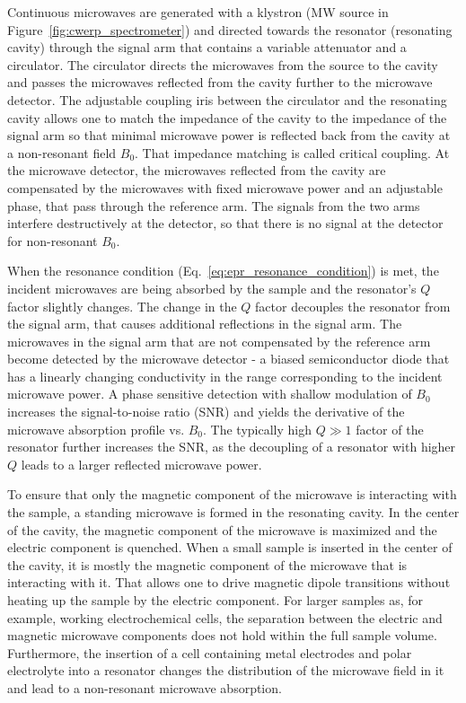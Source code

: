 \par
Continuous microwaves are generated with a klystron (MW source in Figure~\ref{fig:cwerp_spectrometer}) and directed towards the resonator (resonating cavity) through the signal arm that contains a variable attenuator and a circulator. The circulator directs the microwaves from the source to the cavity and passes the microwaves reflected from the cavity further to the microwave detector. The adjustable coupling iris between the circulator and the resonating cavity allows one to match the impedance of the cavity to the impedance of the signal arm so that minimal microwave power is reflected back from the cavity at a non-resonant field $B_0$. That impedance matching is called critical coupling. At the microwave detector, the microwaves reflected from the cavity are compensated by the microwaves with fixed microwave power and an adjustable phase, that pass through the reference arm. The signals from the two arms interfere destructively at the detector, so that there is no signal at the detector for non-resonant $B_0$.

\par
When the resonance condition (Eq.~\ref{eq:epr_resonance_condition}) is met, the incident microwaves are being absorbed by the sample and the resonator's $Q$ factor slightly changes. The change in the $Q$ factor decouples the resonator from the signal arm, that causes additional reflections in the signal arm. The microwaves in the signal arm that are not compensated by the reference arm become detected by the microwave detector - a biased semiconductor diode that has a linearly changing conductivity in the range corresponding to the incident microwave power. A phase sensitive detection with shallow modulation of $B_0$ increases the signal-to-noise ratio (SNR) and yields the derivative of the microwave absorption profile vs. $B_0$. The typically high $Q\gg1$ factor of the resonator further increases the SNR, as the decoupling of a resonator with higher $Q$ leads to a larger reflected microwave power.

\par
To ensure that only the magnetic component of the microwave is interacting with the sample, a standing microwave is formed in the resonating cavity. In the center of the cavity, the magnetic component of the microwave is maximized and the electric component is quenched. When a small sample is inserted in the center of the cavity, it is mostly the magnetic component of the microwave that is interacting with it. That allows one to drive magnetic dipole transitions without heating up the sample by the electric component. For larger samples as, for example, working electrochemical cells, the separation between the electric and magnetic microwave components does not hold within the full sample volume. Furthermore, the insertion of a cell containing metal electrodes and polar electrolyte into a resonator changes the distribution of the microwave field in it and lead to a non-resonant microwave absorption.


